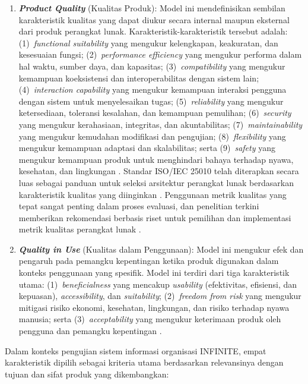 \begin{enumerate}
  \item \textbf{\textit{Product Quality}} (Kualitas Produk): Model ini mendefinisikan sembilan karakteristik kualitas yang dapat diukur secara internal maupun eksternal dari produk perangkat lunak. Karakteristik-karakteristik tersebut adalah: (1)~\textit{functional suitability} yang mengukur kelengkapan, keakuratan, dan kesesuaian fungsi; (2)~\textit{performance efficiency} yang mengukur performa dalam hal waktu, sumber daya, dan kapasitas; (3)~\textit{compatibility} yang mengukur kemampuan koeksistensi dan interoperabilitas dengan sistem lain; (4)~\textit{interaction capability} yang mengukur kemampuan interaksi pengguna dengan sistem untuk menyelesaikan tugas; (5)~\textit{reliability} yang mengukur ketersediaan, toleransi kesalahan, dan kemampuan pemulihan; (6)~\textit{security} yang mengukur kerahasiaan, integritas, dan akuntabilitas; (7)~\textit{maintainability} yang mengukur kemudahan modifikasi dan pengujian; (8)~\textit{flexibility} yang mengukur kemampuan adaptasi dan skalabilitas; serta (9)~\textit{safety} yang mengukur kemampuan produk untuk menghindari bahaya terhadap nyawa, kesehatan, dan lingkungan . Standar ISO/IEC 25010 telah diterapkan secara luas sebagai panduan untuk seleksi arsitektur perangkat lunak berdasarkan karakteristik kualitas yang diinginkan \citep{Haoues_2017_ISO25010Architecture}. Penggunaan metrik kualitas yang tepat sangat penting dalam proses evaluasi, dan penelitian terkini memberikan rekomendasi berbasis riset untuk pemilihan dan implementasi metrik kualitas perangkat lunak \citep{Mladenova_2020_QualityMetrics}.

  \item \textbf{\textit{Quality in Use}} (Kualitas dalam Penggunaan): Model ini mengukur efek dan pengaruh pada pemangku kepentingan ketika produk digunakan dalam konteks penggunaan yang spesifik. Model ini terdiri dari tiga karakteristik utama: (1)~\textit{beneficialness} yang mencakup \textit{usability} (efektivitas, efisiensi, dan kepuasan), \textit{accessibility}, dan \textit{suitability}; (2)~\textit{freedom from risk} yang mengukur mitigasi risiko ekonomi, kesehatan, lingkungan, dan risiko terhadap nyawa manusia; serta (3)~\textit{acceptability} yang mengukur keterimaan produk oleh pengguna dan pemangku kepentingan \citep{Wagner_2018_QualityInUse}.
\end{enumerate}

Dalam konteks pengujian sistem informasi organisasi INFINITE, empat karakteristik dipilih sebagai kriteria utama berdasarkan relevansinya dengan tujuan dan sifat produk yang dikembangkan:

